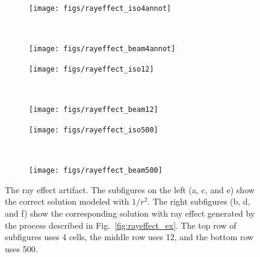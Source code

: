 \begin{figure}
    \centering
    \begin{subfigure}[b]{0.45\textwidth}
        \texttt{[image: figs/rayeffect\_iso4annot]}
        \caption{}
        \label{fig:rayeffect_iso4annot}
    \end{subfigure}
    ~ 
    \begin{subfigure}[b]{0.45\textwidth}
        \texttt{[image: figs/rayeffect\_beam4annot]}
        \caption{}
        \label{fig:rayeffect_beam4annot}
    \end{subfigure}
    
    \begin{subfigure}[b]{0.45\textwidth}
        \texttt{[image: figs/rayeffect\_iso12]}
        \caption{}
        \label{fig:rayeffect_iso12}
    \end{subfigure}
    ~
    \begin{subfigure}[b]{0.45\textwidth}
        \texttt{[image: figs/rayeffect\_beam12]}
        \caption{}
        \label{fig:rayeffect_beam12}
    \end{subfigure}
    
    \begin{subfigure}[b]{0.45\textwidth}
        \texttt{[image: figs/rayeffect\_iso500]}
        \caption{}
        \label{fig:rayeffect_iso500}
    \end{subfigure}
    ~
    \begin{subfigure}[b]{0.45\textwidth}
        \texttt{[image: figs/rayeffect\_beam500]}
        \caption{}
        \label{fig:rayeffect_beam500}
    \end{subfigure}
    \caption{The ray effect artifact. The subfigures on the left (a, c, and e) show the correct solution modeled with $1/r^2$. The right subfigures (b, d, and f) show the corresponding solution with ray effect generated by the process described in Fig.~\ref{fig:rayeffect_ex}. The top row of subfigures uses 4 cells, the middle row uses 12, and the bottom row uses 500.}\label{fig:rayeffect_comp}
\end{figure}

